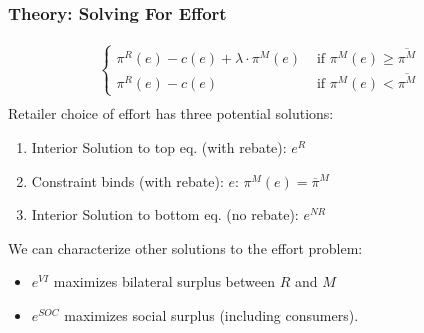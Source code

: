 \documentclass[aspectratio=169]{beamer}
\begin{document}
\begin{frame}
\frametitle{Theory: Solving For Effort}
\begin{eqnarray*}
\label{effortchoice}
\begin{cases}
 \pi^R(e) -c(e) + \lambda \cdot \pi^M(e) &\mbox{ if } \pi^M(e) \geq \overline{\pi^M}\\
 \pi^R(e)  -c(e)   &\mbox{ if } \pi^M(e) < \overline{\pi^M}
\end{cases}\\
\end{eqnarray*}
Retailer choice of effort has three potential solutions:
\begin{enumerate}
\item Interior Solution to top eq. (with rebate): $e^{R}$
\item Constraint binds (with rebate):  $e$: $\pi^M(e) = \overline{\pi}^M$
\item Interior Solution to bottom eq. (no rebate): $e^{NR}$
\end{enumerate}
We can characterize other solutions to the effort problem:
\begin{itemize}
\item $e^{VI}$ maximizes bilateral surplus between $R$ and $M$
\item $e^{SOC}$ maximizes social surplus (including consumers).
\end{itemize}
\end{frame}

\end{document}
